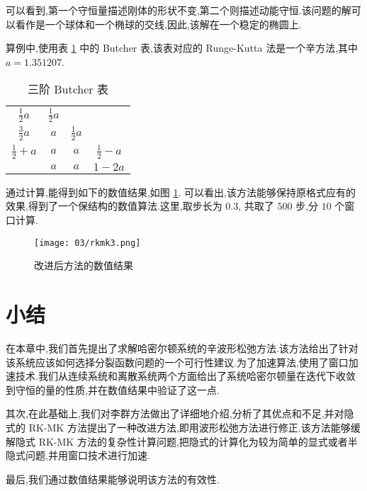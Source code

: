 可以看到,第一个守恒量描述刚体的形状不变,第二个则描述动能守恒.该问题的解可以看作是一个球体和一个椭球的交线,因此,该解在一个稳定的椭圆上.

算例中,使用表 \ref{tbl:04rk3} 中的 Butcher 表,该表对应的 Runge-Kutta 法是一个辛方法,其中 $a = 1.351207$.

\begin{table}[h!]
  \centering
  \caption{三阶 Butcher 表}
  \label{tbl:04rk3}
  \begin{tabular}{c|ccc}
    $\frac{1}{2}a$ & $\frac{1}{2}a$ & & \\
    $\frac{3}{2}a$ & $a$ &$\frac{1}{2}a$  & \\
    $\frac{1}{2} + a$ & $a$ & $a$ &$\frac{1}{2}-a$\\
    \hline
    & $a$ &$a$ & $1-2a$\\
  \end{tabular}
\end{table}

通过计算,能得到如下的数值结果,如图 \ref{fig:rkmk3}. 可以看出,该方法能够保持原格式应有的效果,得到了一个保结构的数值算法.这里,取步长为 $0.3$, 共取了 $500$ 步,分 $10$ 个窗口计算.

\begin{figure}[h!]
  \centering
  \texttt{[image: 03/rkmk3.png]}
  \caption{改进后方法的数值结果}
  \label{fig:rkmk3}
\end{figure}

 \section{小结}\label{sec:03conclusion}
在本章中,我们首先提出了求解哈密尔顿系统的辛波形松弛方法.该方法给出了针对该系统应该如何选择分裂函数问题的一个可行性建议.为了加速算法,使用了窗口加速技术.我们从连续系统和离散系统两个方面给出了系统哈密尔顿量在迭代下收敛到守恒的量的性质,并在数值结果中验证了这一点.

其次,在此基础上,我们对李群方法做出了详细地介绍,分析了其优点和不足,并对隐式的 RK-MK 方法提出了一种改进方法,即用波形松弛方法进行修正.该方法能够缓解隐式 RK-MK 方法的复杂性计算问题,把隐式的计算化为较为简单的显式或者半隐式问题,并用窗口技术进行加速.

最后,我们通过数值结果能够说明该方法的有效性.
